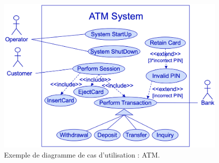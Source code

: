\begin{figure}[H]
	\includegraphics[width=\textwidth]{./Images/Diagrammes/diagram_usecase_ex_atm.png}
	\caption{Exemple de diagramme de cas d'utilisation : ATM.}
	\label{fig:diagram_usecase_ex_atm}
\end{figure}

\newpage
